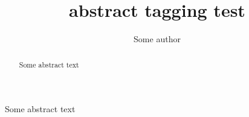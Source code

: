 \documentclass{article}
\title{abstract tagging test}
\author{Some author}
\begin{document}
\maketitle

\begin{origabstract}
Some abstract text
\end{origabstract}

\begin{abstract}
Some abstract text
\end{abstract}

\tableofcontents
\end{document}
